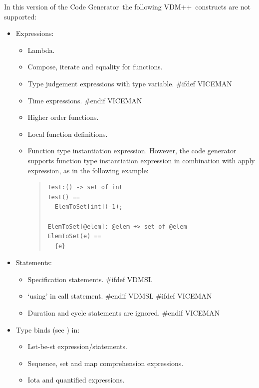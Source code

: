 \documentclass[\pformat,11pt]{article}
\newcommand{\tcg}{the Code Generator}
\newcommand{\langmancite}{\cite{LangManPP-SCSK}}
\newcommand{\VDM}{VDM++}
\begin{document}
In this version of \tcg\ the following \VDM\ constructs are not supported:

\begin{itemize}

\item Expressions:

  \begin{itemize}
  \item Lambda.
  \item Compose, iterate and equality for functions.
  \item Type judgement expressions with type variable.
#ifdef VICEMAN
  \item Time expressions.
#endif VICEMAN
  \item Higher order functions.
  \item Local function definitions.
  \item Function type instantiation expression. However, the code
    generator supports function type instantiation expression in
    combination with apply expression, as in the following example:

\begin{quote}
\begin{verbatim}
Test:() -> set of int
Test() ==
  ElemToSet[int](-1);

ElemToSet[@elem]: @elem +> set of @elem
ElemToSet(e) ==
  {e}
\end{verbatim}
\end{quote}

  \end{itemize}

\item Statements: 

  \begin{itemize}
  \item Specification statements.
#ifdef VDMSL
  \item `{\sf using}' in call statement.
#endif VDMSL
#ifdef VICEMAN
  \item Duration and cycle statements are ignored.
#endif VICEMAN
  \end{itemize}

\item Type binds (see \langmancite) in:

  \begin{itemize}
  \item Let-be-st expression/statements.
  \item Sequence, set and map comprehension expressions.
  \item Iota and quantified expressions.
  \end{itemize}


\end{itemize}
\end{document}

